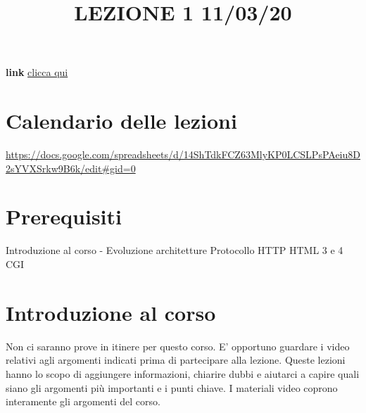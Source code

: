 \title{LEZIONE 1 11/03/20}\newline
\textbf{link} \href{https://web.microsoftstream.com/video/58568b1d-5fc5-41c0-88f6-608e4b8f9f7a}{clicca qui}
\section*{Calendario delle lezioni}
\url{https://docs.google.com/spreadsheets/d/14ShTdkFCZ63MlyKP0LCSLPsPAeiu8D2sYVXSrkw9B6k/edit#gid=0}
\section*{Prerequisiti}
Introduzione al corso - Evoluzione architetture \newline
Protocollo HTTP \newline
HTML 3 e 4 \newline
CGI
\section*{Introduzione al corso}
Non ci saranno prove in itinere per questo corso.\newline
E' opportuno guardare i video relativi agli argomenti indicati prima di partecipare alla lezione.\newline
Queste lezioni hanno lo scopo di aggiungere informazioni, chiarire dubbi e aiutarci a capire quali siano gli argomenti più importanti e i punti chiave.\newline
I materiali video coprono interamente gli argomenti del corso.
